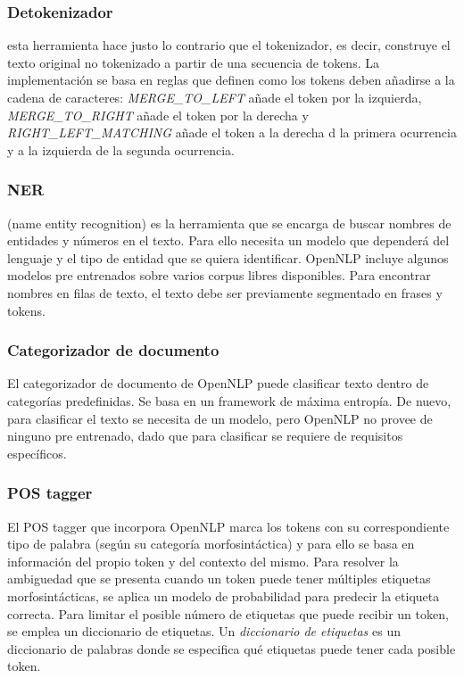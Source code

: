 \subsubsection{Detokenizador}
esta herramienta hace justo lo contrario que el tokenizador, es decir, construye el texto original no tokenizado a partir de una secuencia de tokens. La implementación se basa en reglas que definen como los tokens deben añadirse a la cadena de caracteres:  \textsl{MERGE\_TO\_LEFT} añade el token por la izquierda, \textsl{MERGE\_TO\_RIGHT} añade el token por la derecha y \textsl{RIGHT\_LEFT\_MATCHING} añade el token a la derecha d la primera ocurrencia y a la izquierda de la segunda ocurrencia.
\subsubsection{NER}
(name entity recognition) es la herramienta que se encarga de buscar nombres de entidades y números en el texto. Para ello necesita un modelo que dependerá del lenguaje y el tipo de entidad que se quiera identificar. OpenNLP incluye algunos modelos pre entrenados sobre varios corpus libres disponibles. Para encontrar nombres en filas de texto, el texto debe ser previamente segmentado en frases y tokens.  
\subsubsection{Categorizador de documento}
El categorizador de documento de OpenNLP puede clasificar texto dentro de categorías predefinidas. Se basa en un framework de máxima entropía. De nuevo, para clasificar el texto se necesita de un modelo, pero OpenNLP no provee de ninguno pre entrenado, dado que para clasificar se requiere de requisitos específicos. 
\subsubsection{POS tagger}
El POS tagger que incorpora OpenNLP marca los tokens con su correspondiente tipo de palabra (según su categoría morfosintáctica) y para ello se basa en información del propio token y del contexto del mismo. Para resolver la ambiguedad que se presenta cuando un token puede tener múltiples etiquetas morfosintácticas, se aplica un modelo de probabilidad para predecir la etiqueta correcta. Para limitar el posible número de etiquetas que puede recibir un token, se emplea un diccionario de etiquetas. \newline
Un \textsl{diccionario de etiquetas} es un diccionario de palabras donde se especifica qué etiquetas puede tener cada posible token.
